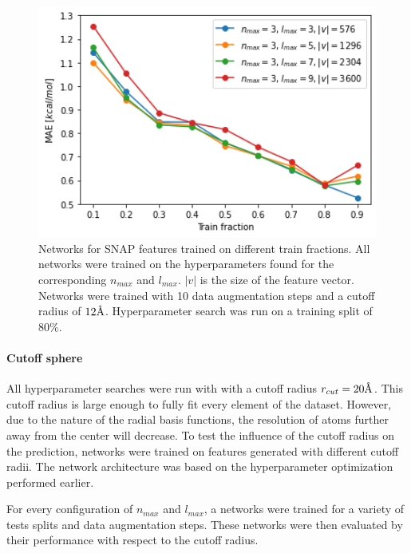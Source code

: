 \begin{figure}[!htb]
    \includegraphics[width=1.0\textwidth]{figures/regression/snap/fixn.png}
  \endminipage
  \caption[Learning curves for different SNAP resolutions]{
  Networks for SNAP features trained on different train fractions.
  All networks were trained on the hyperparameters found for the corresponding $n_{max}$ and $l_{max}$.
  $|v|$ is the size of the feature vector.
  Networks were trained with 10 data augmentation steps and a cutoff radius of $12 \AA$.
  Hyperparameter search was run on a training split of 80\%.
  }
  \label{fig:snap_hyperparameter}
\end{figure}

\paragraph{Cutoff sphere}
All hyperparameter searches were run with with a cutoff radius $r_{cut} = 20 \AA$.
This cutoff radius is large enough to fully fit every element of the dataset.
However, due to the nature of the radial basis functions, the resolution of atoms 
further away from the center will decrease.
To test the influence of the cutoff radius on the prediction, 
networks were trained on features generated with different cutoff radii.
The network architecture was based on the hyperparameter optimization performed earlier.

For every configuration of $n_{max}$ and $l_{max}$, a networks were trained for a variety 
of tests splits and data augmentation steps.
These networks were then evaluated by their performance with respect to the cutoff radius.

